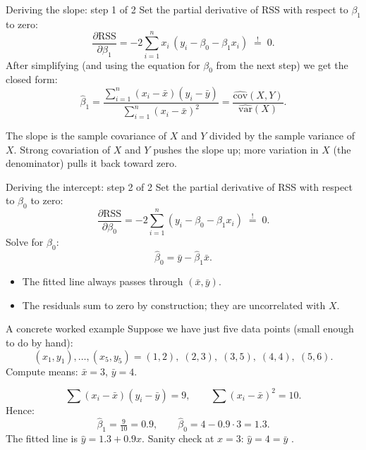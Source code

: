 \documentclass[aspectratio=169,11pt]{beamer}
\begin{document}
\begin{frame}{Deriving the slope: step 1 of 2}
  Set the partial derivative of RSS with respect to $\beta_1$ to zero:
  \[
    \frac{\partial \mathrm{RSS}}{\partial \beta_1}
      = -2 \sum_{i=1}^n x_i\,(y_i - \beta_0 - \beta_1 x_i) \;\stackrel{!}{=}\; 0.
  \]
  After simplifying (and using the equation for $\beta_0$ from the next
  step) we get the closed form:
  \[
    \boxed{\;
      \hat\beta_1
        = \frac{\sum_{i=1}^n (x_i - \bar x)(y_i - \bar y)}
               {\sum_{i=1}^n (x_i - \bar x)^2}
        = \frac{\widehat{\mathrm{cov}}(X, Y)}{\widehat{\mathrm{var}}(X)}.
    \;}
  \]
  \begin{readme}
    The slope is the sample covariance of $X$ and $Y$ divided by the
    sample variance of $X$. Strong covariation of $X$ and $Y$ pushes the slope up; more variation in
    $X$ (the denominator) pulls it back toward zero.
  \end{readme}
\end{frame}

\begin{frame}{Deriving the intercept: step 2 of 2}
  Set the partial derivative of RSS with respect to $\beta_0$ to zero:
  \[
    \frac{\partial \mathrm{RSS}}{\partial \beta_0}
      = -2 \sum_{i=1}^n (y_i - \beta_0 - \beta_1 x_i) \;\stackrel{!}{=}\; 0.
  \]
  Solve for $\beta_0$:
  \[
    \boxed{\;
      \hat\beta_0 = \bar y - \hat\beta_1 \bar x.
    \;}
  \]
  \begin{takeaway}
    \begin{itemize}
      \item The fitted line always passes through $(\bar x, \bar y)$.
      \item The residuals sum to zero by construction; they are
            uncorrelated with $X$.
    \end{itemize}
  \end{takeaway}
\end{frame}

\begin{frame}{A concrete worked example}
  Suppose we have just five data points (small enough to do by hand):
  \[
    (x_1, y_1), \ldots, (x_5, y_5)
      = (1, 2),\;(2, 3),\;(3, 5),\;(4, 4),\;(5, 6).
  \]
  Compute means: $\bar x = 3$, $\bar y = 4$.
  \begin{numexample}
    \[
      \sum (x_i - \bar x)(y_i - \bar y) = 9, \qquad
      \sum (x_i - \bar x)^2 = 10.
    \]
    Hence:
    \[
      \hat\beta_1 = \tfrac{9}{10} = 0.9, \qquad
      \hat\beta_0 = 4 - 0.9 \cdot 3 = 1.3.
    \]
    The fitted line is $\hat y = 1.3 + 0.9 x$. Sanity check at
    $x = 3$: $\hat y = 4 = \bar y$ \checkmark.
  \end{numexample}
\end{frame}
\end{document}
